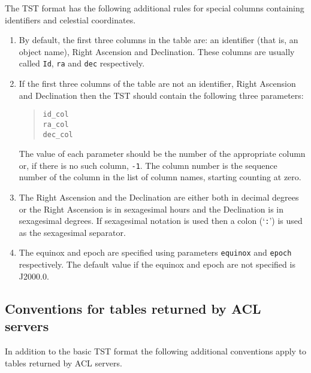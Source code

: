 \documentclass[twoside,11pt,nolof,chapters]{starlink}
\begin{document}
The TST format has the following additional rules for special columns
containing identifiers and celestial coordinates.

\begin{enumerate}

  \item By default, the first three columns in the table are: an identifier
   (that is, an object name), Right Ascension and Declination.  These
   columns are usually called \texttt{Id}, \texttt{ra} and \texttt{dec}
   respectively.

  \item If the first three columns of the table are not an identifier,
   Right Ascension and Declination then the TST should contain the
   following three parameters:

  \begin{quote}
   \texttt{id\_col \\
   ra\_col \\
   dec\_col}
  \end{quote}

   The value of each parameter should be the number of the appropriate
   column or, if there is no such column, \texttt{-1}.  The column number is the
   sequence number of the column in the list of column names, starting
   counting at zero.

  \item The Right Ascension and the Declination are either both in
   decimal degrees or the Right Ascension is in sexagesimal hours
   and the Declination is in sexagesimal degrees.  If sexagesimal
   notation is used then a colon (`\texttt{:}') is used as the sexagesimal
   separator.

  \item The equinox and epoch are specified using parameters \texttt{equinox} and \texttt{epoch} respectively.  The default value if the
   equinox and epoch are not specified is J2000.0.

\end{enumerate}

\subsection{Conventions for tables returned by ACL servers}

In addition to the basic TST format the following additional conventions
apply to tables returned by ACL servers.
\end{document}
